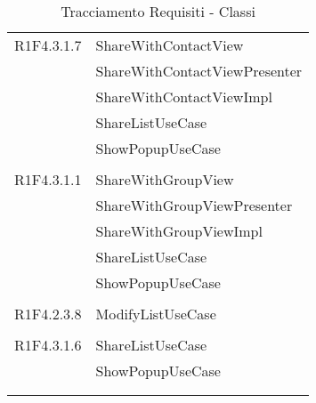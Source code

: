 \begin{center}
\begin{longtable}{|p{7cm}|p{7cm}|}
		R1F4.3.1.7 & ShareWithContactView \\ & ShareWithContactViewPresenter \\ & ShareWithContactViewImpl \\ & ShareListUseCase \\ & ShowPopupUseCase \\ & \\ \hline
		R1F4.3.1.1 & ShareWithGroupView \\ & ShareWithGroupViewPresenter \\ & ShareWithGroupViewImpl \\ & ShareListUseCase \\ & ShowPopupUseCase \\ & \\ \hline
		R1F4.2.3.8 & ModifyListUseCase \\ & \\ \hline
		R1F4.3.1.6 & ShareListUseCase \\ & ShowPopupUseCase \\ & \\ \hline
	\caption[Tracciamento Requisiti - Classi]{Tracciamento Requisiti - Classi}
	\label{tabella: Tracciamento Requisiti - Classi}
	\end{longtable}
\end{center}

